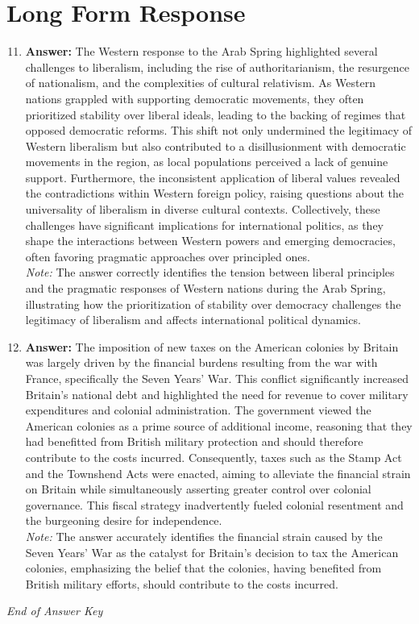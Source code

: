 \documentclass[12pt]{article}
\begin{document}
\section*{Long Form Response}
\begin{enumerate}[label=\arabic*.]
\setcounter{enumi}{10}
\item \textbf{Answer:} The Western response to the Arab Spring highlighted several challenges to liberalism, including the rise of authoritarianism, the resurgence of nationalism, and the complexities of cultural relativism. As Western nations grappled with supporting democratic movements, they often prioritized stability over liberal ideals, leading to the backing of regimes that opposed democratic reforms. This shift not only undermined the legitimacy of Western liberalism but also contributed to a disillusionment with democratic movements in the region, as local populations perceived a lack of genuine support. Furthermore, the inconsistent application of liberal values revealed the contradictions within Western foreign policy, raising questions about the universality of liberalism in diverse cultural contexts. Collectively, these challenges have significant implications for international politics, as they shape the interactions between Western powers and emerging democracies, often favoring pragmatic approaches over principled ones.
\\ \textit{Note:} The answer correctly identifies the tension between liberal principles and the pragmatic responses of Western nations during the Arab Spring, illustrating how the prioritization of stability over democracy challenges the legitimacy of liberalism and affects international political dynamics.
\item \textbf{Answer:} The imposition of new taxes on the American colonies by Britain was largely driven by the financial burdens resulting from the war with France, specifically the Seven Years' War. This conflict significantly increased Britain's national debt and highlighted the need for revenue to cover military expenditures and colonial administration. The government viewed the American colonies as a prime source of additional income, reasoning that they had benefitted from British military protection and should therefore contribute to the costs incurred. Consequently, taxes such as the Stamp Act and the Townshend Acts were enacted, aiming to alleviate the financial strain on Britain while simultaneously asserting greater control over colonial governance. This fiscal strategy inadvertently fueled colonial resentment and the burgeoning desire for independence.
\\ \textit{Note:} The answer accurately identifies the financial strain caused by the Seven Years' War as the catalyst for Britain's decision to tax the American colonies, emphasizing the belief that the colonies, having benefited from British military efforts, should contribute to the costs incurred.
\end{enumerate}

\vfill
\noindent\textit{End of Answer Key}
\end{document}
